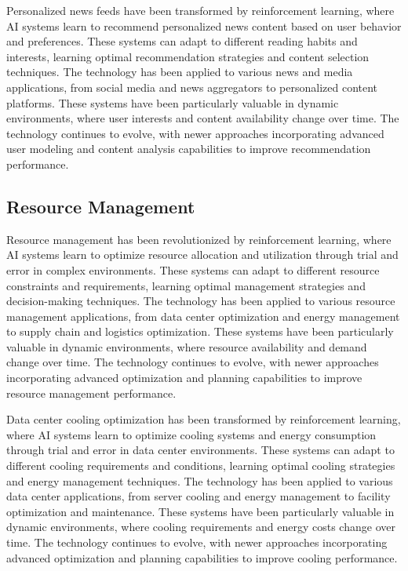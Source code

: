 Personalized news feeds have been transformed by reinforcement learning, where AI systems learn to recommend personalized news content based on user behavior and preferences. These systems can adapt to different reading habits and interests, learning optimal recommendation strategies and content selection techniques. The technology has been applied to various news and media applications, from social media and news aggregators to personalized content platforms. These systems have been particularly valuable in dynamic environments, where user interests and content availability change over time. The technology continues to evolve, with newer approaches incorporating advanced user modeling and content analysis capabilities to improve recommendation performance.

\subsection{Resource Management}

Resource management has been revolutionized by reinforcement learning, where AI systems learn to optimize resource allocation and utilization through trial and error in complex environments. These systems can adapt to different resource constraints and requirements, learning optimal management strategies and decision-making techniques. The technology has been applied to various resource management applications, from data center optimization and energy management to supply chain and logistics optimization. These systems have been particularly valuable in dynamic environments, where resource availability and demand change over time. The technology continues to evolve, with newer approaches incorporating advanced optimization and planning capabilities to improve resource management performance.

Data center cooling optimization has been transformed by reinforcement learning, where AI systems learn to optimize cooling systems and energy consumption through trial and error in data center environments. These systems can adapt to different cooling requirements and conditions, learning optimal cooling strategies and energy management techniques. The technology has been applied to various data center applications, from server cooling and energy management to facility optimization and maintenance. These systems have been particularly valuable in dynamic environments, where cooling requirements and energy costs change over time. The technology continues to evolve, with newer approaches incorporating advanced optimization and planning capabilities to improve cooling performance.


